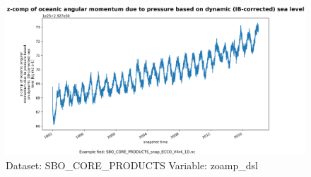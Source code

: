 \begin{figure}[H]
\centering
\includegraphics[scale=0.55]{../images/plots/oneD_plots/SBO_Core_Products/zoamp_dsl.png}
\caption{Dataset: SBO\_CORE\_PRODUCTS Variable: zoamp\_dsl}
\label{tab:table-SBO_CORE_PRODUCTS_zoamp_dsl-Plot}
\end{figure}
\pagebreak
